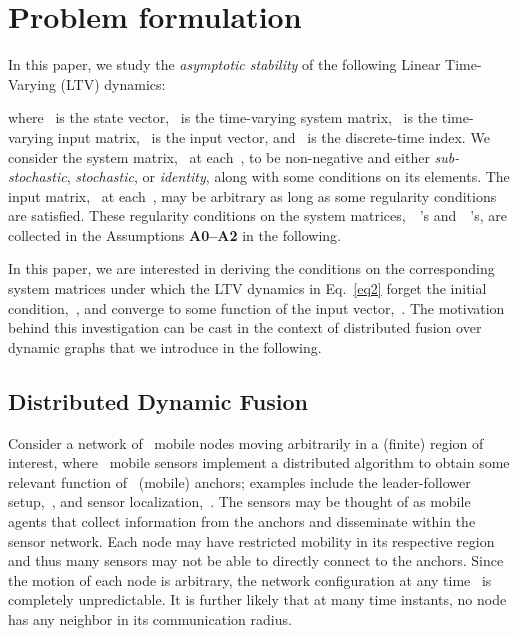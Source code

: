\documentclass[draftclsnofoot, onecolumn, 12pt]{IEEEtran}
\begin{document}
\section{Problem formulation}\label{PF}
In this paper, we study the \textit{asymptotic stability} of the following Linear Time-Varying (LTV) dynamics:

where~ is the state vector,~ is the time-varying system matrix,~ is the time-varying input matrix,~ is the input vector, and~ is the discrete-time index. We consider the system matrix,~ at each~, to be non-negative and either \emph{sub-stochastic}, \emph{stochastic}, or \emph{identity}, along with some  conditions on its elements. The input matrix,~ at each~, may be arbitrary as long as some regularity conditions are satisfied. These regularity conditions on the system matrices,~~'s and~~'s, are collected in the Assumptions {\bf A0--A2} in the following. 

In this paper, we are interested in deriving the conditions on the corresponding system matrices under which the LTV dynamics in Eq.~\eqref{eq2} forget the initial condition,~, and converge to some function of the input vector,~. The motivation behind this investigation can be cast in the context of distributed fusion over dynamic graphs that we introduce in the following. 

\subsection{Distributed Dynamic Fusion} 
Consider a network of~ mobile nodes moving arbitrarily in a (finite) region of interest, where~ mobile sensors implement a distributed algorithm to obtain some relevant function of~ (mobile) anchors; examples include the leader-follower setup,~\cite{tanner02,4200874}, and sensor localization,~\cite{khan2009distributed,khan2010diland}. The sensors may be thought of as mobile agents that collect information from the anchors and disseminate within the sensor network. Each node may have restricted mobility in its respective region and thus many sensors may not be able to directly connect to the anchors. Since the motion of each node is arbitrary, the network configuration at any time~ is completely unpredictable. It is further likely that at many time instants, no node has any neighbor in its communication radius. 
\end{document}
